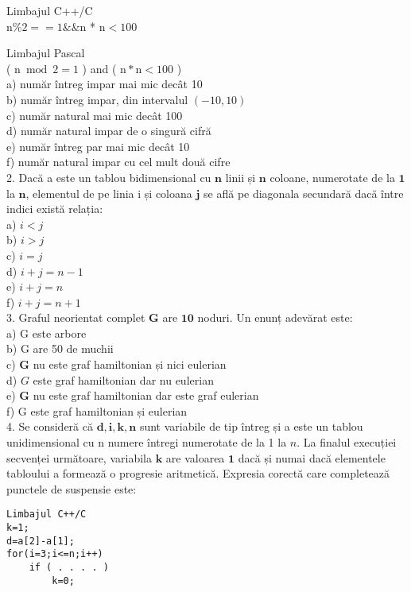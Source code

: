 Limbajul C++/C\\
$\mathrm{n} \% 2==1 \& \& \mathrm{n}$ * $\mathrm{n}<100$

Limbajul Pascal\\
( $\mathrm{n} \bmod 2=1$ ) and ( $\mathrm{n} * \mathrm{n}<100$ )\\
a) număr întreg impar mai mic decât 10\\
b) număr întreg impar, din intervalul $(-10,10)$\\
c) număr natural mai mic decât 100\\
d) număr natural impar de o singură cifră\\
e) număr întreg par mai mic decât 10\\
f) număr natural impar cu cel mult două cifre\\
2. Dacă a este un tablou bidimensional cu $\mathbf{n}$ linii și $\mathbf{n}$ coloane, numerotate de la $\mathbf{1}$ la $\mathbf{n}$, elementul de pe linia i și coloana $\mathbf{j}$ se află pe diagonala secundară dacă între indici există relația:\\
a) $i<j$\\
b) $i>j$\\
c) $i=j$\\
d) $i+j=n-1$\\
e) $i+j=n$\\
f) $i+j=n+1$\\
3. Graful neorientat complet $\mathbf{G}$ are $\mathbf{1 0}$ noduri. Un enunț adevărat este:\\
a) G este arbore\\
b) G are 50 de muchii\\
c) $\mathbf{G}$ nu este graf hamiltonian și nici eulerian\\
d) $G$ este graf hamiltonian dar nu eulerian\\
e) $\mathbf{G}$ nu este graf hamiltonian dar este graf eulerian\\
f) G este graf hamiltonian și eulerian\\
4. Se consideră că $\mathbf{d}, \mathbf{i}, \mathbf{k}, \mathbf{n}$ sunt variabile de tip întreg și a este un tablou unidimensional cu n numere întregi numerotate de la 1 la $n$. La finalul execuției secvenței următoare, variabila $\mathbf{k}$ are valoarea $\mathbf{1}$ dacă și numai dacă elementele tabloului a formează o progresie aritmetică. Expresia corectă care completează punctele de suspensie este:

\begin{verbatim}
Limbajul C++/C
k=1;
d=a[2]-a[1];
for(i=3;i<=n;i++)
    if ( . . . . )
        k=0;
\end{verbatim}


